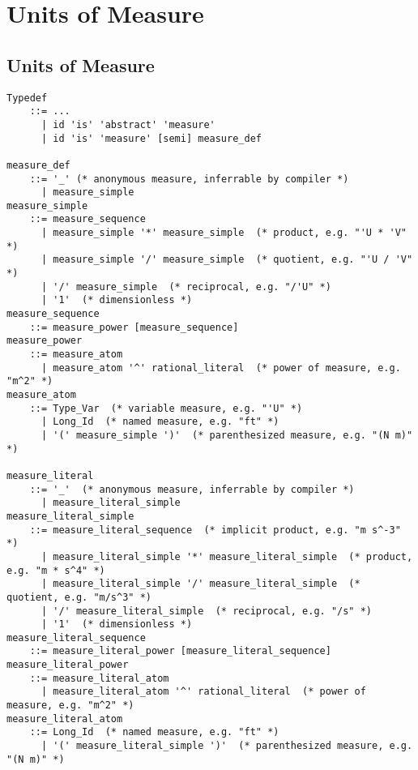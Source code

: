 
\chapter{Units of Measure}
\label{sec:units-of-measure}

\minitoc

\newpage

\section{Units of Measure}

\syntax\begin{lstlisting}
Typedef 
    ::= ...
      | id 'is' 'abstract' 'measure' 
      | id 'is' 'measure' [semi] measure_def
      
measure_def 
    ::= '_' (* anonymous measure, inferrable by compiler *)
      | measure_simple
measure_simple
    ::= measure_sequence
      | measure_simple '*' measure_simple  (* product, e.g. "'U * 'V" *)
      | measure_simple '/' measure_simple  (* quotient, e.g. "'U / 'V" *)
      | '/' measure_simple  (* reciprocal, e.g. "/'U" *)
      | '1'  (* dimensionless *)
measure_sequence
    ::= measure_power [measure_sequence]
measure_power
    ::= measure_atom
      | measure_atom '^' rational_literal  (* power of measure, e.g. "m^2" *)
measure_atom
    ::= Type_Var  (* variable measure, e.g. "'U" *)
      | Long_Id  (* named measure, e.g. "ft" *)
      | '(' measure_simple ')'  (* parenthesized measure, e.g. "(N m)" *)
      
measure_literal
    ::= '_'  (* anonymous measure, inferrable by compiler *)
      | measure_literal_simple
measure_literal_simple
    ::= measure_literal_sequence  (* implicit product, e.g. "m s^-3" *)
      | measure_literal_simple '*' measure_literal_simple  (* product, e.g. "m * s^4" *)
      | measure_literal_simple '/' measure_literal_simple  (* quotient, e.g. "m/s^3" *)
      | '/' measure_literal_simple  (* reciprocal, e.g. "/s" *)
      | '1'  (* dimensionless *)
measure_literal_sequence
    ::= measure_literal_power [measure_literal_sequence]
measure_literal_power
    ::= measure_literal_atom
      | measure_literal_atom '^' rational_literal  (* power of measure, e.g. "m^2" *)
measure_literal_atom
    ::= Long_Id  (* named measure, e.g. "ft" *)
      | '(' measure_literal_simple ')'  (* parenthesized measure, e.g. "(N m)" *)
\end{lstlisting}


